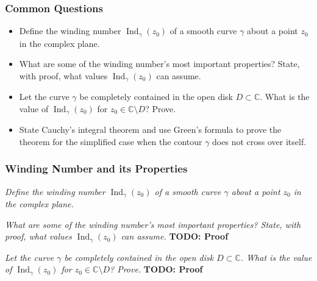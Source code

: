 \documentclass[11pt, a4paper]{article}
\newcommand{\question}[1]{\textit{#1}\vspace{2mm}}
\newcommand{\C}{\mathbb{C}} %
\begin{document}
\subsubsection{Common Questions}
\begin{itemize}
	\item Define the winding number $ \operatorname{Ind}_{\gamma}(z_0) $ of a smooth curve $ \gamma $ about a point $ z_0 $ in the complex plane. 
	
	\item What are some of the winding number's most important properties? State, with proof, what values $ \operatorname{Ind}_{\gamma}(z_0) $ can assume. 
	
	\item Let the curve $ \gamma $ be completely contained in the open disk $ D \subset \C $. What is the value of $ \operatorname{Ind}_{\gamma}(z_0) $ for $ z_0 \in \C \setminus D $? Prove. 

	\item State Cauchy's integral theorem and use Green's formula to prove the theorem for the simplified case when the contour $ \gamma $ does not cross over itself.
\end{itemize}



\subsubsection{Winding Number and its Properties}
\question{Define the winding number $ \operatorname{Ind}_{\gamma}(z_0) $ of a smooth curve $ \gamma $ about a point $ z_0 $ in the complex plane. }

\question{What are some of the winding number's most important properties? State, with proof, what values $ \operatorname{Ind}_{\gamma}(z_0) $ can assume.} \textbf{TODO: Proof}

\question{Let the curve $ \gamma $ be completely contained in the open disk $ D \subset \C $. What is the value of $ \operatorname{Ind}_{\gamma}(z_0) $ for $ z_0 \in \C \setminus D $? Prove.} \textbf{TODO: Proof}
\end{document}
